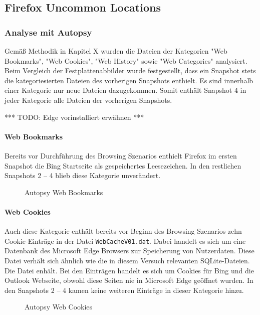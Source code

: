 \begin{appendices}
\subsection*{Firefox Uncommon Locations}

\subsubsection*{Analyse mit Autopsy}

Gemäß Methodik in Kapitel X wurden die Dateien der Kategorien "Web Bookmarks", "Web Cookies", "Web History" sowie "Web Categories" analysiert.
Beim Vergleich der Festplattenabbilder wurde festgestellt, dass ein Snapshot stets die kategoriesierten Dateien des vorherigen Snapshots enthielt. Es sind innerhalb einer Kategorie nur neue Dateien dazugekommen. Somit enthält Snapshot 4 in jeder Kategorie alle Dateien der vorherigen Snapshots.

*** TODO: Edge vorinstalliert erwähnen ***

\paragraph*{Web Bookmarks}

Bereits vor Durchführung des Browsing Szenarios enthielt Firefox im ersten Snapshot die Bing Startseite als gespeichertes Leesezeichen. In den restlichen Snapshots 2 -- 4 blieb diese Kategorie unverändert.

\begin{figure}[h!]
	\centerline{}
	\label{chart:final-criteria}  
	\caption{Autopsy Web Bookmarks}
\end{figure}

\paragraph*{Web Cookies}
Auch diese Kategorie enthält bereits vor Beginn des Browsing Szenarios zehn Cookie-Einträge in der Datei \texttt{WebCacheV01.dat}. Dabei handelt es sich um eine Datenbank des Microsoft Edge Browsers zur Speicherung von Nutzerdaten. Diese Datei verhält sich ähnlich wie die in diesem Versuch relevanten SQLite-Dateien. Die Datei enhält. Bei den Einträgen handelt es sich um Cookies für Bing und die Outlook Webseite, obwohl diese Seiten nie in Microsoft Edge geöffnet wurden. In den Snapshots 2 -- 4 kamen keine weiteren Einträge in dieser Kategorie hinzu.
\begin{figure}[h!]
	\centerline{}
	\label{chart:final-criteria}  
	\caption{Autopsy Web Cookies}
\end{figure}


\end{appendices}
